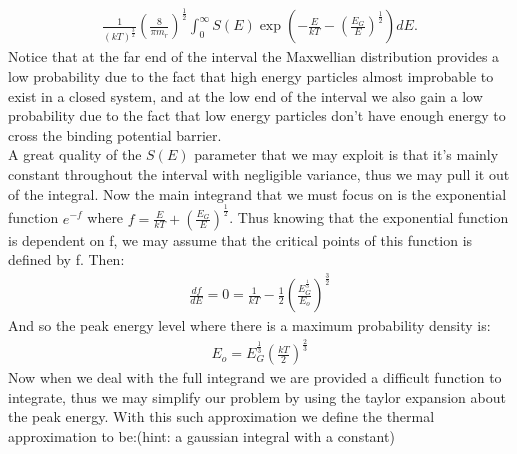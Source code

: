\documentclass[11pt]{article}
\theoremstyle{quest}
\begin{document}
\begin{align}
\frac{1}{(kT)^{\frac{3}{2}}} (\frac{8}{\pi m_r})^{\frac{1}{2}} \int_{0}^{\infty} S(E) \exp(-\frac{E}{kT} - (\frac{E_G}{E})^{\frac{1}{2}}) dE.
\end{align}
Notice that at the far end of the interval the Maxwellian distribution provides a low probability due to the fact that high energy particles almost improbable to exist in a closed system, and at the low end of the interval we also gain a low probability due to the fact that low energy particles don't have enough energy to cross the binding potential barrier.\\
A great quality of the $S(E)$ parameter that we may exploit is that it's mainly constant throughout the interval with negligible variance, thus we may pull it out of the integral. Now the main integrand that we must focus on is the exponential function $e^{-f}$ where $f = \frac{E}{kT} + (\frac{E_G}{E})^{\frac{1}{2}}$. Thus knowing that the exponential function is dependent on f, we may assume that the critical points of this function is defined by f. Then:
\begin{align*}
\frac{df}{dE} = 0 = \frac{1}{kT} - \frac{1}{2}(\frac{E_G^\frac{1}{3}}{E_o})^{\frac{3}{2}}
\end{align*}
And so the peak energy level where there is a maximum probability density is: \begin{align}
E_o = E_G^{\frac{1}{3}}(\frac{kT}{2})^{\frac{2}{3}}
\end{align}
Now when we deal with the full integrand we are provided a difficult function to integrate, thus we may simplify our problem by using the taylor expansion about the peak energy. With this such approximation we define the thermal approximation to be:(hint: a gaussian integral with a constant)
\end{document}
